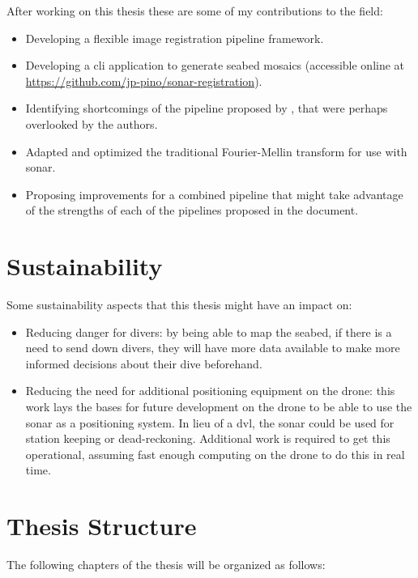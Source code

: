 After working on this thesis these are some of my contributions to the field:
\begin{itemize}
    \item Developing a flexible image registration pipeline framework.
    \item Developing a \acrshort{cli} application to generate seabed mosaics (accessible online at \href{https://github.com/jp-pino/sonar-registration}{https://github.com/jp-pino/sonar-registration}).
    \item Identifying shortcomings of the pipeline proposed by \citeauthor{Hurtos2015}\cite{Hurtos2015}, that were perhaps overlooked by the authors.
    \item Adapted and optimized the traditional Fourier-Mellin transform for use with \acrshort{sonar}.
    \item Proposing improvements for a combined pipeline that might take advantage of the strengths of each of the pipelines proposed in the document. 
\end{itemize}


\section{Sustainability}

Some sustainability aspects that this thesis might have an impact on:

\begin{itemize}
    \item Reducing danger for divers: by being able to map the seabed, if there is a need to send down divers, they will have more data available to make more informed decisions about their dive beforehand.
    \item Reducing the need for additional positioning equipment on the drone: this work lays the bases for future development on the drone to be able to use the sonar as a positioning system. In lieu of a \acrshort{dvl}, the sonar could be used for station keeping or dead-reckoning. Additional work is required to get this operational, assuming fast enough computing on the drone to do this in real time. 
\end{itemize}


\section{Thesis Structure}

The following chapters of the thesis will be organized as follows:


